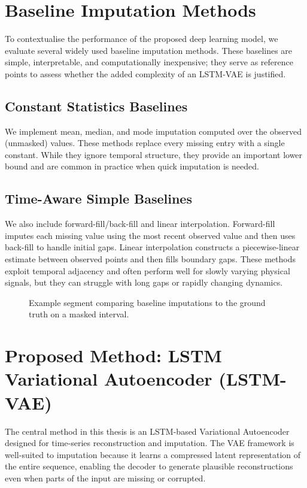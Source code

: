 \section{Baseline Imputation Methods}
To contextualise the performance of the proposed deep learning model, we evaluate several widely used baseline imputation methods. These baselines are simple, interpretable, and computationally inexpensive; they serve as reference points to assess whether the added complexity of an LSTM-VAE is justified.

\subsection{Constant Statistics Baselines}
We implement mean, median, and mode imputation computed over the observed (unmasked) values. These methods replace every missing entry with a single constant. While they ignore temporal structure, they provide an important lower bound and are common in practice when quick imputation is needed.

\subsection{Time-Aware Simple Baselines}
We also include forward-fill/back-fill and linear interpolation. Forward-fill imputes each missing value using the most recent observed value and then uses back-fill to handle initial gaps. Linear interpolation constructs a piecewise-linear estimate between observed points and then fills boundary gaps. These methods exploit temporal adjacency and often perform well for slowly varying physical signals, but they can struggle with long gaps or rapidly changing dynamics.

\begin{figure}[ht]
	\centering
	\caption{Example segment comparing baseline imputations to the ground truth on a masked interval.}
	\label{fig:baseline-visual}
\end{figure}

\section{Proposed Method: LSTM Variational Autoencoder (LSTM-VAE)}
The central method in this thesis is an LSTM-based Variational Autoencoder designed for time-series reconstruction and imputation. The VAE framework is well-suited to imputation because it learns a compressed latent representation of the entire sequence, enabling the decoder to generate plausible reconstructions even when parts of the input are missing or corrupted.

